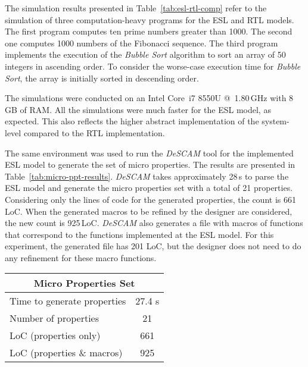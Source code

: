 The simulation results presented in Table~\ref{tab:esl-rtl-comp} refer to the simulation of three computation-heavy programs for the ESL and RTL models. The first program computes ten prime numbers greater than 1000. The second one computes 1000 numbers of the Fibonacci sequence. The third program implements the execution of the \textit{Bubble Sort} algorithm to sort an array of 50 integers in ascending order. To consider the worse-case execution time for \textit{Bubble Sort}, the array is initially sorted in descending order.

The simulations were conducted on an Intel Core~i7 8550U @~1.80\,GHz with 8\,GB of RAM. All the simulations were much faster for the ESL model, as expected. This also reflects the higher abstract implementation of the system-level compared to the RTL implementation.

The same environment was used to run the \textit{DeSCAM} tool for the implemented ESL model to generate the set of micro properties. The results are presented in Table~\ref{tab:micro-ppt-results}. \textit{DeSCAM} takes approximately 28\,s to parse the ESL model and generate the micro properties set with a total of 21 properties. Considering only the lines of code for the generated properties, the count is 661\,LoC. When the generated macros to be refined by the designer are considered, the new count is 925\,LoC. \textit{DeSCAM} also generates a file with macros of functions that correspond to the functions implemented at the ESL model. For this experiment, the generated file has 201 LoC, but the designer does not need to do any refinement for these macro functions.  

\begin{table*}[htb!] 
	\centering 
	\caption{Results for micro properties generated by \textit{DeSCAM} from the RI5CY ESL model.} 
	\label{tab:micro-ppt-results}
	\begin{tabular}{p{6cm} c } 
		\multicolumn{2}{c}{\textbf{Micro Properties Set}} \\  
		\hline	
		Time to generate properties  &  27.4 s  \\
		Number of properties  &  21 \\
		LoC (properties only)  &  661 \\
		LoC (properties \& macros)  &  925\\
	\end{tabular} 
\end{table*}


